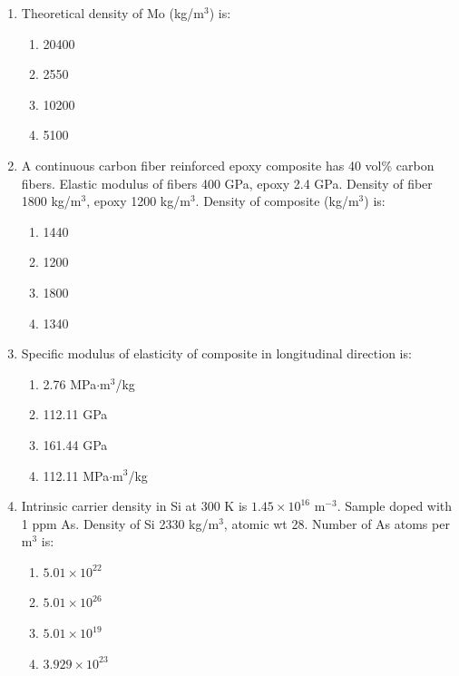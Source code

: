 \documentclass[journal,cmex10]{IEEEtran}
\theoremstyle{remark}
\numberwithin{equation}{enumi}
\numberwithin{figure}{enumi}
\begin{document}
\begin{enumerate}[label=\arabic*)]
\vspace{0.5cm}
\item  Theoretical density of Mo (kg/m$^3$) is:  
\hfill{}
\begin{enumerate}[label=\alph*)]
    \item 20400
    \item 2550
    \item 10200
    \item 5100
\end{enumerate}

\vspace{0.5cm}
\item  A continuous carbon fiber reinforced epoxy composite has 40 vol\% carbon fibers. Elastic modulus of fibers 400 GPa, epoxy 2.4 GPa. Density of fiber 1800 kg/m$^3$, epoxy 1200 kg/m$^3$. Density of composite (kg/m$^3$) is:  
\vspace{0.2cm}
\hfill{}
\begin{enumerate}[label=\alph*)]
    \item 1440
    \item 1200
    \item 1800
    \item 1340
\end{enumerate}

\vspace{0.5cm}
\item Specific modulus of elasticity of composite in longitudinal direction is:  
\vspace{0.3cm}
\hfill{}
\begin{enumerate}[label=\alph*)]
    \item 2.76 MPa$\cdot$m$^3$/kg
    \item 112.11 GPa
    \item 161.44 GPa
    \item 112.11 MPa$\cdot$m$^3$/kg
\end{enumerate}

\newpage

\item  Intrinsic carrier density in Si at 300 K is $1.45 \times 10^{16}$ m$^{-3}$. Sample doped with 1 ppm As. Density of Si 2330 kg/m$^3$, atomic wt 28. Number of As atoms per m$^3$ is:  
\vspace{0.3cm}
\hfill{}
\begin{enumerate}[label=\alph*)]
    \item $5.01 \times 10^{22}$
    \item $5.01 \times 10^{26}$
    \item $5.01 \times 10^{19}$
    \item $3.929 \times 10^{23}$
\end{enumerate}


\end{enumerate}
\end{document}
